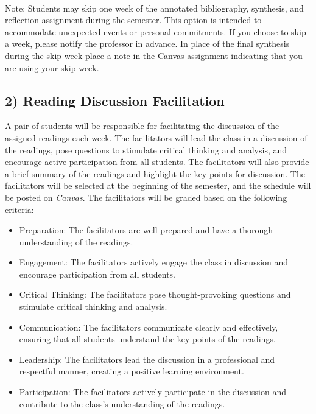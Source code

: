 \documentclass[12pt, letterpaper]{article}
\begin{document}
\paragraph{} Note: Students may skip one week of the annotated bibliography, synthesis, and reflection assignment during the semester. This option is intended to accommodate unexpected events or personal commitments. If you choose to skip a week, please notify the professor in advance. In place of the final synthesis during the skip week place a note in the Canvas assignment indicating that you are using your skip week.

\subsection*{2) Reading Discussion Facilitation}
A pair of students will be responsible for facilitating the discussion of the assigned readings each week. The facilitators will lead the class in a discussion of the readings, pose questions to stimulate critical thinking and analysis, and encourage active participation from all students. The facilitators will also provide a brief summary of the readings and highlight the key points for discussion. The facilitators will be selected at the beginning of the semester, and the schedule will be posted on \emph{Canvas}. The facilitators will be graded based on the following criteria:

\begin{itemize}
    \item Preparation: The facilitators are well-prepared and have a thorough understanding of the readings.
    \item Engagement: The facilitators actively engage the class in discussion and encourage participation from all students.
    \item Critical Thinking: The facilitators pose thought-provoking questions and stimulate critical thinking and analysis.
    \item Communication: The facilitators communicate clearly and effectively, ensuring that all students understand the key points of the readings.
    \item Leadership: The facilitators lead the discussion in a professional and respectful manner, creating a positive learning environment.
    \item Participation: The facilitators actively participate in the discussion and contribute to the class's understanding of the readings.
\end{itemize}
\end{document}
